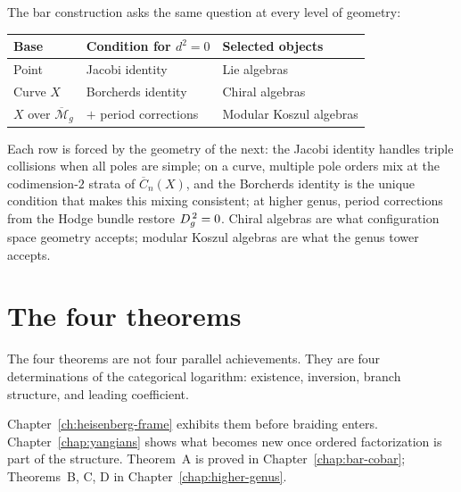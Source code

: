 \begin{remark}
\label{rem:classical-vs-chiral-selection}
The bar construction asks the same question at every level
of geometry:
\begin{center}
\small
\begin{tabular}{lll}
\textbf{Base} & \textbf{Condition for $d^2 = 0$}
  & \textbf{Selected objects} \\
\hline
Point & Jacobi identity & Lie algebras \\
Curve $X$ & Borcherds identity & Chiral algebras \\
$X$ over $\overline{\mathcal{M}}_g$ & $+$ period corrections
  & Modular Koszul algebras
\end{tabular}
\end{center}
Each row is forced by the geometry of the next: the Jacobi
identity handles triple collisions when all poles are simple;
on a curve, multiple pole orders mix at the codimension-$2$
strata of $\overline{C}_n(X)$, and the Borcherds identity is
the unique condition that makes this mixing consistent; at
higher genus, period corrections from the Hodge bundle restore
$D_{g}^{\,2} = 0$.  Chiral algebras are what configuration
space geometry accepts; modular Koszul algebras are what the
genus tower accepts.
\end{remark}


\section{The four theorems}
\label{sec:NAP-unifying}
\label{sec:main-results-complete}

The four theorems are not four parallel achievements.  They are four
determinations of the categorical logarithm: existence, inversion,
branch structure, and leading coefficient.

Chapter~\ref{ch:heisenberg-frame} exhibits them before braiding enters.
Chapter~\ref{chap:yangians} shows what becomes new once ordered
factorization is part of the structure.  Theorem~A is proved in
Chapter~\ref{chap:bar-cobar}; Theorems~B, C, D in
Chapter~\ref{chap:higher-genus}.

